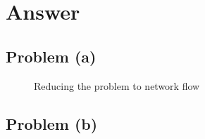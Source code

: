 \documentclass[12pt,letterpaper]{article}
\begin{document}
\section*{Answer}

\subsection*{Problem (a)}
\begin{figure}
\caption{Reducing the problem to network flow}
\end{figure}

\subsection*{Problem (b)}
\end{document}
